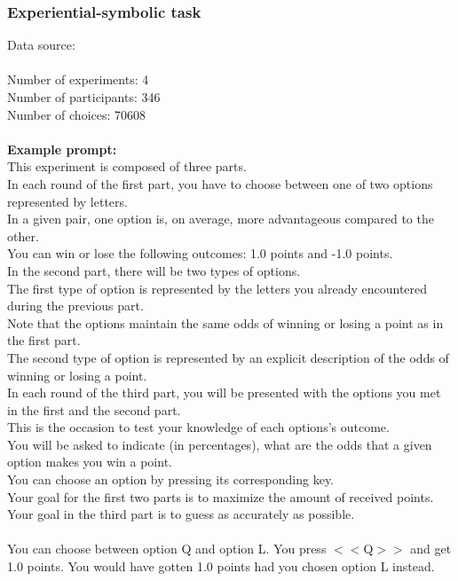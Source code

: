 \documentclass[pdflatex,sn-nature]{sn-jnl}%
\theoremstyle{thmstyleone}%
\theoremstyle{thmstyletwo}%
\theoremstyle{thmstylethree}%
\begin{document}
\subsubsection*{Experiential-symbolic task}
Data source: \cite{garcia2023experiential} \\ $~$ \\
Number of experiments: 4 $~$\\ 
Number of participants: 346 $~$\\ 
Number of choices: 70608 $~$\\ 
 $~$\\ 
\textbf{Example prompt:}
 $~$\\ 
This experiment is composed of three parts. $~$\\ 
In each round of the first part, you have to choose between one of two options represented by letters. $~$\\ 
In a given pair, one option is, on average, more advantageous compared to the other. $~$\\ 
You can win or lose the following outcomes: 1.0 points and -1.0 points. $~$\\ 
In the second part, there will be two types of options. $~$\\ 
The first type of option is represented by the letters you already encountered during the previous part. $~$\\ 
Note that the options maintain the same odds of winning or losing a point as in the first part. $~$\\ 
The second type of option is represented by an explicit description of the odds of winning or losing a point. $~$\\ 
In each round of the third part, you will be presented with the options you met in the first and the second part. $~$\\ 
This is the occasion to test your knowledge of each options's outcome. $~$\\ 
You will be asked to indicate (in percentages), what are the odds that a given option makes you win a point. $~$\\ 
You can choose an option by pressing its corresponding key. $~$\\ 
Your goal for the first two parts is to maximize the amount of received points. $~$\\ 
Your goal in the third part is to guess as accurately as possible. $~$\\ 
 $~$\\ 
You can choose between option Q and option L. You press $<<$Q$>>$ and get 1.0 points. You would have gotten 1.0 points had you chosen option L instead.  $~$\\ 
\end{document}
